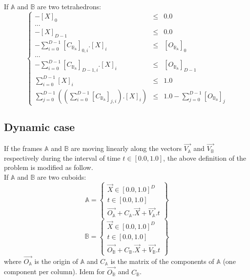 \documentclass[12pt, a4paper]{article}
\begin{document}
If $\mathbb{A}$ and $\mathbb{B}$ are two tetrahedrons:
\begin{equation}
\left\lbrace
\begin{array}{rcl}
-\left[X\right]_0&\le&0.0\\
...\\
-\left[X\right]_{D-1}&\le&0.0\\
-\sum_{i=0}^{D-1}\left[C_{\mathbb{B}_\mathbb{A}}\right]_{0,i}.\left[X\right]_i&\le&\left[O_{\mathbb{B}_\mathbb{A}}\right]_0\\
...\\
-\sum_{i=0}^{D-1}\left[C_{\mathbb{B}_\mathbb{A}}\right]_{D-1,i}.\left[X\right]_i&\le&\left[O_{\mathbb{B}_\mathbb{A}}\right]_{D-1}\\
\sum_{i=0}^{D-1}\left[X\right]_i&\le&1.0\\
\sum_{j=0}^{D-1}\left(\left(\sum_{i=0}^{D-1}\left[C_{\mathbb{B}_\mathbb{A}}\right]_{j,i}\right).\left[X\right]_i\right)&\le&1.0-\sum_{j=0}^{D-1}\left[O_{\mathbb{B}_\mathbb{A}}\right]_j
\end{array}
\right.
\end{equation}

\subsection{Dynamic case}

If the frames $\mathbb{A}$ and $\mathbb{B}$ are moving linearly along the vectors $\overrightarrow{V_\mathbb{A}}$ and $\overrightarrow{V_\mathbb{B}}$ respectively during the interval of time $t\in[0.0,1.0]$, the above definition of the problem is modified as follow.\\

If $\mathbb{A}$ and $\mathbb{B}$ are two cuboids:
\begin{equation}
\mathbb{A}=\left\lbrace
\begin{array}{c}
\overrightarrow{X}\in[0.0,1.0]^D\\
t\in[0.0,1.0]\\
\overrightarrow{O_\mathbb{A}}+C_\mathbb{A}.\overrightarrow{X}+\overrightarrow{V_\mathbb{A}}.t
\end{array}
\right\rbrace
\end{equation}
\begin{equation}
\mathbb{B}=\left\lbrace
\begin{array}{c}
\overrightarrow{X}\in[0.0,1.0]^D\\
t\in[0.0,1.0]\\
\overrightarrow{O_\mathbb{B}}+C_\mathbb{B}.\overrightarrow{X}+\overrightarrow{V_\mathbb{B}}.t
\end{array}
\right\rbrace
\end{equation}
where $\overrightarrow{O_\mathbb{A}}$ is the origin of $\mathbb{A}$ and $C_\mathbb{A}$ is the matrix of the components of $\mathbb{A}$ (one component per column). Idem for $\overrightarrow{O_\mathbb{B}}$ and $C_\mathbb{B}$.\\
\end{document}
